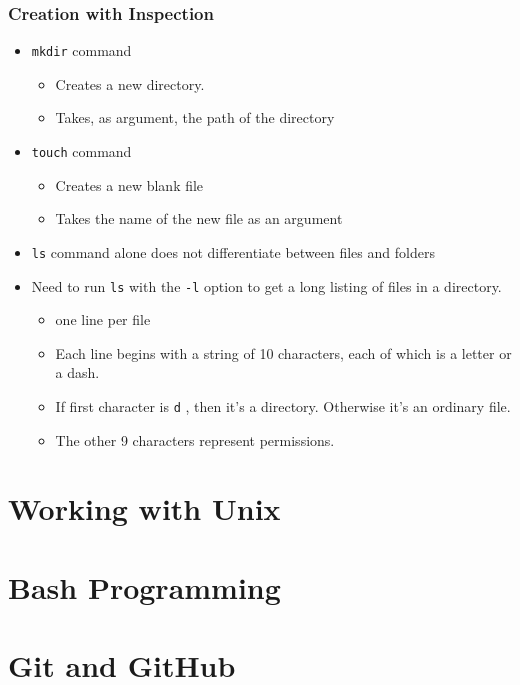\documentclass[12pt]{article}
\newcommand{\code}[1]{
\texttt{#1}
}
\begin{document}
		  \subsubsection{Creation with Inspection}
		  \begin{itemize}
		  \item \code{mkdir} command
		  	\begin{itemize}
		  		\item Creates a new directory.
		  		\item Takes, as argument, the path of the directory
		  	\end{itemize}
		  	
		  \item \code{touch} command
		  	\begin{itemize}
		  		\item Creates a new blank file
		  		\item Takes the name of the new file as an argument
		  		
		  	\end{itemize}
		  	
		  	\item \code{ls} command alone does not differentiate between files and folders
		  	\item Need to run \code{ls} with the \code{-l} option to get a long listing of files in a directory.
		  	\begin{itemize}
		  		\item one line per file
		  		\item Each line begins with a string of 10 characters, each of which is a letter or a dash.
		  		\item If first character is \code{d}, then it's a directory. Otherwise it's an ordinary file.
		  		
		  		\item The other 9 characters represent permissions.
		  	\end{itemize}
		  	
		  	
		  	
		  \end{itemize}
	
	\section{Working with Unix}
	
	
	\section{Bash Programming}
	
	
	\section{Git and GitHub}
	
\end{document}
